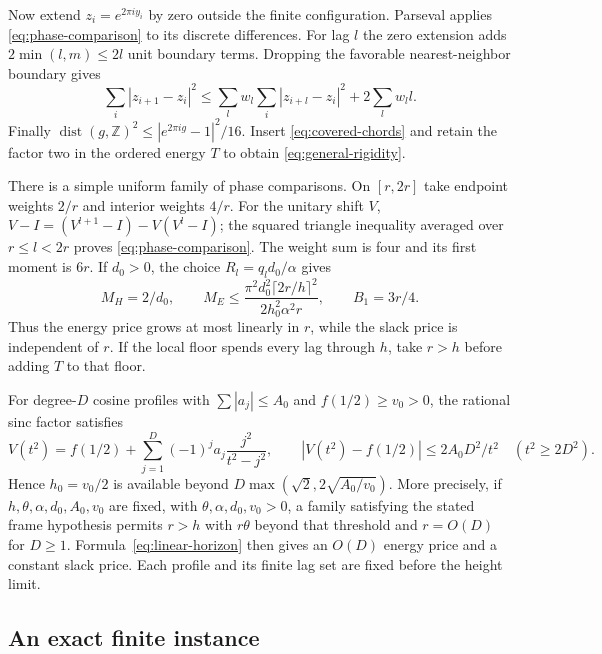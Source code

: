 \documentclass[11pt,reqno]{amsart}
\numberwithin{equation}{section}
\newcommand{\Z}{\mathbb Z}
\newcommand{\dist}{\operatorname{dist}}
\begin{document}
Now extend $z_i=e^{2\pi iy_i}$ by zero outside the finite configuration.
Parseval applies \eqref{eq:phase-comparison} to its discrete differences.
For lag $l$ the zero extension adds $2\min(l,m)\le2l$ unit boundary
terms. Dropping the favorable nearest-neighbor boundary gives
\[
 \sum_i|z_{i+1}-z_i|^2
 \le\sum_lw_l\sum_i|z_{i+l}-z_i|^2+2\sum_lw_ll.
\]
Finally $\dist(g,\Z)^2\le|e^{2\pi ig}-1|^2/16$.
Insert \eqref{eq:covered-chords} and retain the factor two in the
ordered energy $T$ to obtain \eqref{eq:general-rigidity}.

There is a simple uniform family of phase comparisons. On $[r,2r]$
take endpoint weights $2/r$ and interior weights $4/r$.
For the unitary shift $V$,
$V-I=(V^{l+1}-I)-V(V^l-I)$; the squared triangle inequality averaged
over $r\le l<2r$ proves \eqref{eq:phase-comparison}. The weight sum
is four and its first moment is $6r$. If $d_0>0$, the choice
$R_l=q_ld_0/\alpha$ gives
\begin{equation}
 M_H=2/d_0,\qquad
 M_E\le\frac{\pi^2d_0^2\lceil2r/h\rceil^2}
 {2h_0^2\alpha^2r},\qquad B_1=3r/4.
 \label{eq:linear-horizon}
\end{equation}
Thus the energy price grows at most linearly in $r$, while the slack
price is independent of $r$. If the local floor spends every lag through
$h$, take $r>h$ before adding $T$ to that floor.

For degree-$D$ cosine profiles with
$\sum|a_j|\le A_0$ and $f(1/2)\ge v_0>0$, the rational sinc factor
satisfies
\[
 V(t^2)=f(1/2)+\sum_{j=1}^D(-1)^ja_j\frac{j^2}{t^2-j^2},\qquad
 |V(t^2)-f(1/2)|\le2A_0D^2/t^2\quad(t^2\ge2D^2).
\]
Hence $h_0=v_0/2$ is available beyond
$D\max(\sqrt2,2\sqrt{A_0/v_0})$. More precisely, if
$h,\theta,\alpha,d_0,A_0,v_0$ are fixed, with
$\theta,\alpha,d_0,v_0>0$, a family satisfying the stated frame
hypothesis permits $r>h$ with $r\theta$ beyond that threshold and
$r=O(D)$ for $D\ge1$. Formula~\eqref{eq:linear-horizon} then gives
an $O(D)$ energy price and a constant slack price.
Each profile and its finite lag set are fixed before the height limit.

\subsection{An exact finite instance}
\end{document}
